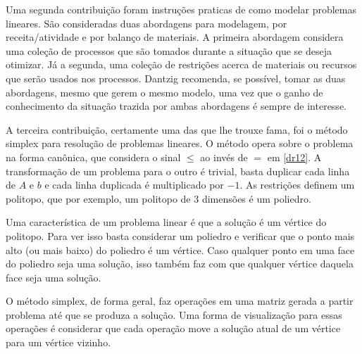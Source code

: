 Uma segunda contribuição foram instruções praticas de como modelar problemas lineares.
São consideradas duas abordagens para modelagem, por receita/atividade e por balanço
de materiais. A primeira abordagem considera uma coleção de processos que são tomados
durante a situação que se deseja otimizar. Já a segunda, uma coleção de restrições acerca
de materiais ou recursos que serão usados nos processos. Dantzig recomenda, se possível,
tomar as duas abordagens, mesmo que gerem o mesmo modelo, uma vez que o ganho de conhecimento
da situação trazida por ambas abordagens é sempre de interesse.

A terceira contribuição, certamente uma das que lhe trouxe fama, foi o método simplex para
resolução de problemas lineares. O método opera sobre o problema na forma canônica, que
considera o sinal \(\leq\) ao invés de \(=\) em \ref{dr12}. A transformação de um problema
para o outro é trivial, basta duplicar cada linha de \(A\) e \(b\) e cada linha duplicada
é multiplicado por \(-1\). As restrições definem um politopo, que por exemplo, um politopo
de 3 dimensões é um poliedro.

Uma característica de um problema linear é que a solução é um vértice do politopo. Para ver
isso basta considerar um poliedro e verificar que o ponto mais alto (ou mais baixo) do
poliedro é um vértice. Caso qualquer ponto em uma face do poliedro seja uma solução, isso
também faz com que qualquer vértice daquela face seja uma solução.

O método simplex, de forma geral, faz operações em uma matriz gerada a partir problema
até que se produza a solução. Uma forma de visualização para essas operações é considerar
que cada operação move a solução atual de um vértice para um vértice vizinho.